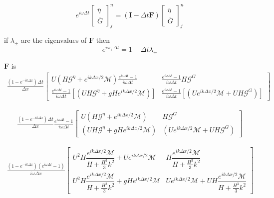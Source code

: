 \documentclass[12pt]{article}
\newcommand{\matr}[1]{\mathbf{#1}}
\begin{document}
  \begin{equation}
  e^{i\omega \Delta t}\begin{bmatrix}
  \overline{\eta} \\ \overline{G}
  \end{bmatrix}^{n}_j = \left(\matr{I}  - \Delta t \matr{F} \right) \begin{bmatrix}
  \overline{\eta} \\ \overline{G}
  \end{bmatrix}^{n}_j
  \end{equation}
  
  if $\lambda_\pm$ are the eigenvalues of $\matr{F}$ then
\[e^{i\omega_\pm \Delta t} = 1 - \Delta t \lambda_\pm\]

$\matr{F}$ is 
\begin{align}
\frac{\left(1 - e^{-ik\Delta x}\right) \Delta t}{ \Delta x} \begin{bmatrix}
U\left(H\mathcal{G}^\eta + e^{i {k\Delta x}/{2}} \mathcal{M}\right)\frac{e^{i\omega \Delta t} -1}{i\omega\Delta t} & \frac{e^{i\omega \Delta t} -1}{i\omega\Delta t} H\mathcal{G}^G \\
 \frac{e^{i\omega \Delta t} -1}{i\omega\Delta t} \left[ \left(UH\mathcal{G}^\eta + gH e^{i {k\Delta x}/{2}}\mathcal{M} \right) \right] &
\frac{e^{i\omega \Delta t} -1}{i\omega\Delta t}\left[ \left(Ue^{i {k\Delta x}/{2}}\mathcal{M} + UH \mathcal{G}^G \right)  \right]
\end{bmatrix}
\end{align}

\begin{align}
\frac{\left(1 - e^{-ik\Delta x}\right) \Delta t}{ \Delta x} \frac{e^{i\omega \Delta t} -1}{i\omega\Delta t} \begin{bmatrix}
U\left(H\mathcal{G}^\eta + e^{i {k\Delta x}/{2}} \mathcal{M}\right) &  H\mathcal{G}^G \\
 \left(UH\mathcal{G}^\eta + gH e^{i {k\Delta x}/{2}}\mathcal{M} \right) & \left(Ue^{i {k\Delta x}/{2}}\mathcal{M} + UH \mathcal{G}^G \right)
\end{bmatrix}
\end{align}



\begin{align}
\frac{\left(1 - e^{-ik\Delta x}\right) \left(e^{i\omega \Delta t} -1\right) }{ i\omega\Delta x}  \begin{bmatrix}
U^2H\dfrac{ e^{i {k\Delta x}/{2}}\mathcal{M}}{H  + \frac{H^3}{3}k^2} + Ue^{i {k\Delta x}/{2}} \mathcal{M} &  H\dfrac{ e^{i {k\Delta x}/{2}}\mathcal{M}}{H  + \frac{H^3}{3}k^2}\\
U^2H\dfrac{ e^{i {k\Delta x}/{2}}\mathcal{M}}{H  + \frac{H^3}{3}k^2} + gH e^{i {k\Delta x}/{2}}\mathcal{M}  &Ue^{i {k\Delta x}/{2}}\mathcal{M} + UH\dfrac{ e^{i {k\Delta x}/{2}}\mathcal{M}}{H  + \frac{H^3}{3}k^2} 
\end{bmatrix}
\end{align}
\end{document}
